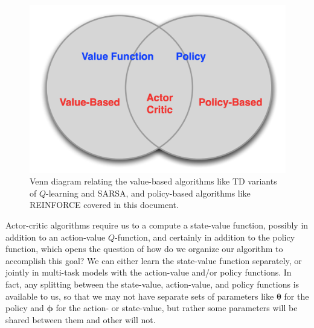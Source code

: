\documentclass{article}
\begin{document}
\begin{figure}
\label{fig:rl_venn_diagram}
    \begin{center}
    \includegraphics[width=0.75\linewidth]{rl_venn_diagram}
    \caption{Venn diagram relating the value-based algorithms like TD variants of $Q$-learning and SARSA, and policy-based algorithms like REINFORCE covered in this document. \footnotemark}
    \label{fig:basis_small_width}
    \end{center}
\end{figure}

Actor-critic algorithms require us to a compute a state-value function, possibly in addition to an action-value $Q$-function, and certainly in addition to the policy function, which opens the question of how do we organize our algorithm to accomplish this goal? We can either learn the state-value function separately, or jointly in multi-task models with the action-value and/or policy functions. In fact, any splitting between the state-value, action-value, and policy functions is available to us, so that we may not have separate sets of parameters like $\boldsymbol{\theta}$ for the policy and $\boldsymbol{\phi}$ for the action- or state-value, but rather some parameters will be shared between them and other will not. 
\end{document}
